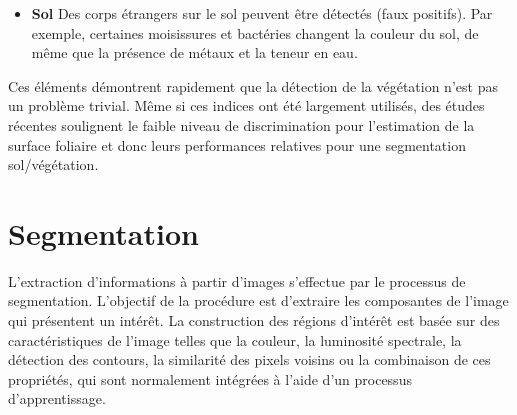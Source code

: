 \documentclass[../thesis.tex]{subfiles}
\begin{document}
\begin{itemize}
        \item \textbf{Sol} Des corps étrangers sur le sol peuvent être détectés (faux positifs). Par exemple, certaines moisissures et bactéries changent la couleur du sol, de même que la présence de métaux et la teneur en eau.
        
    \end{itemize}
    
    \vspace{1em}
    Ces éléments démontrent rapidement que la détection de la végétation n'est pas un problème trivial. Même si ces indices ont été largement utilisés, des études récentes soulignent le faible niveau de discrimination pour l'estimation de la surface foliaire \cite{su11030864, rs13132617} et donc leurs performances relatives pour une segmentation sol/végétation.
    
    
    
    
    \newpage
    \section{Segmentation}
    \label{sec:segmentation}
    
    L'extraction d'informations à partir d'images s'effectue par le processus de segmentation. L'objectif de la procédure est d'extraire les composantes de l'image qui présentent un intérêt. La construction des régions d'intérêt est basée sur des caractéristiques de l'image telles que la couleur, la luminosité spectrale, la détection des contours, la similarité des pixels voisins ou la combinaison de ces propriétés, qui sont normalement intégrées à l'aide d'un processus d'apprentissage.
    
\end{document}
